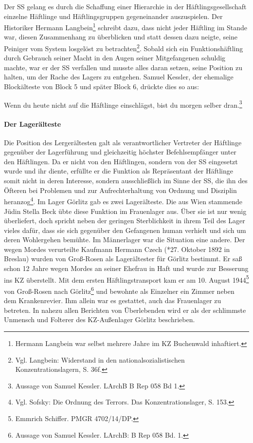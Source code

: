 \documentclass[a4paper,12pt,ngerman,
]{nisebook}
\begin{document}
Der SS gelang es durch die Schaffung einer Hierarchie in der Häftlingsgesellschaft einzelne Häftlinge und Häftlingsgruppen gegeneinander auszuspielen.
Der Historiker Hermann Langbein\footnote{Hermann Langbein war selbst mehrere Jahre im KZ Buchenwald inhaftiert.} schreibt dazu, dass nicht jeder Häftling im Stande war, diesen Zusammenhang zu überblicken und statt dessen dazu neigte, seine Peiniger vom System losgelöst zu betrachten\footnote{Vgl. Langbein: Widerstand in den nationalsozialistischen Konzentrationslagern, S. 36f.}. Sobald sich ein Funktionshäftling durch Gebrauch seiner Macht in den Augen seiner Mitgefangenen schuldig machte, war er der SS verfallen und musste alles daran setzen, seine Position zu halten, um der Rache des Lagers zu entgehen.
Samuel Kessler, der ehemalige Blockälteste von Block 5 und später Block 6, drückte dies so aus:
\begin{leftbar}
Wenn du heute nicht auf die Häftlinge einschlägst, bist du morgen selber dran.\footnote{Aussage von Samuel Kessler. LArchB B Rep 058 Bd 1.}
\end{leftbar}


\paragraph{Der Lagerälteste}\label{czech} Die Position des Lergerältesten galt als verantwortlicher Vertreter der Häftlinge gegenüber der Lagerführung und gleichzeitig höchster Befehlsempfänger unter den Häftlingen. Da er nicht von den Häftlingen, sondern von der SS eingesetzt wurde und ihr diente, erfüllte er die Funktion als Repräsentant der Häftlinge somit nicht in deren Interesse, sondern ausschließlich im Sinne der SS, die ihn des Öfteren bei Problemen und zur Aufrechterhaltung von Ordnung und Disziplin heranzog\footnote{Vgl. Sofsky: Die Ordnung des Terrors. Das Konzentrationslager, S. 153.}.
\newline
Im Lager Görlitz gab es zwei Lagerälteste. Die aus Wien stammende Jüdin Stella Beck übte diese Funktion im Frauenlager aus. Über sie ist nur wenig überliefert, doch spricht neben der geringen Sterblichkeit in ihrem Teil des Lager vieles dafür, dass sie sich gegenüber den Gefangenen human verhielt und sich um deren Wohlergehen bemühte.
\newline
Im Männerlager war die Situation eine andere.
Der wegen Mordes verurteilte Kaufmann Hermann Czech (*27. Oktober 1892 in Breslau) wurden von Groß-Rosen als Lagerältester für Görlitz bestimmt. Er saß schon 12 Jahre wegen Mordes an seiner Ehefrau in Haft und wurde zur Besserung ins KZ überstellt. Mit dem ersten Häftlingstransport kam er am 10. August 1944\footnote{Emmrich Schiffer. PMGR 4702/14/DP.} von Groß-Rosen nach Görlitz\footnote{Aussage von Samuel Kessler. LArchB: B Rep 058 Bd. 1.} und bewohnte als Einzelner ein Zimmer neben dem Krankenrevier. Ihm allein war es gestattet, auch das Frauenlager zu betreten. In nahezu allen Berichten von Überlebenden wird er als der schlimmste Unmensch und Folterer des KZ-Außenlager Görlitz beschrieben.
\end{document}
